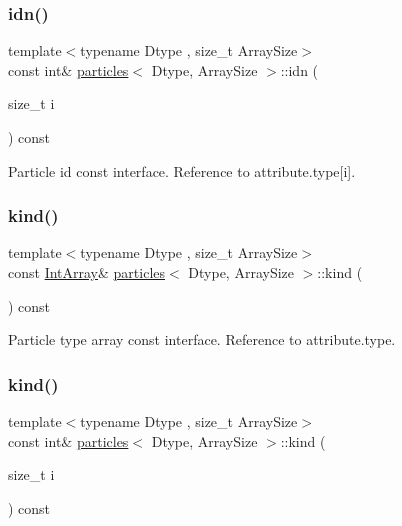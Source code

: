 \subsubsection{\texorpdfstring{idn()}{idn()}\hspace{0.1cm}{\footnotesize\ttfamily [2/2]}}
{\footnotesize\ttfamily template$<$typename Dtype , size\+\_\+t Array\+Size$>$ \\
const int\& \mbox{\hyperlink{classparticles}{particles}}$<$ Dtype, Array\+Size $>$\+::idn (\begin{DoxyParamCaption}\item[{size\+\_\+t}]{i }\end{DoxyParamCaption}) const\hspace{0.3cm}{\ttfamily [inline]}}



Particle id const interface. Reference to attribute.\+type\mbox{[}i\mbox{]}. 

\mbox{\label{classparticles_a64f8ee4ddc337e0f05fd41088cf07f00}} 
\subsubsection{\texorpdfstring{kind()}{kind()}\hspace{0.1cm}{\footnotesize\ttfamily [1/2]}}
{\footnotesize\ttfamily template$<$typename Dtype , size\+\_\+t Array\+Size$>$ \\
const \mbox{\hyperlink{classparticles_a1b766bf5ccced2005beaacbb07e46bf9}{Int\+Array}}\& \mbox{\hyperlink{classparticles}{particles}}$<$ Dtype, Array\+Size $>$\+::kind (\begin{DoxyParamCaption}{ }\end{DoxyParamCaption}) const\hspace{0.3cm}{\ttfamily [inline]}}



Particle type array const interface. Reference to attribute.\+type. 

\mbox{\label{classparticles_abe61f1f99b1ea75e9b87927d1012a1f2}} 
\subsubsection{\texorpdfstring{kind()}{kind()}\hspace{0.1cm}{\footnotesize\ttfamily [2/2]}}
{\footnotesize\ttfamily template$<$typename Dtype , size\+\_\+t Array\+Size$>$ \\
const int\& \mbox{\hyperlink{classparticles}{particles}}$<$ Dtype, Array\+Size $>$\+::kind (\begin{DoxyParamCaption}\item[{size\+\_\+t}]{i }\end{DoxyParamCaption}) const\hspace{0.3cm}{\ttfamily [inline]}}



